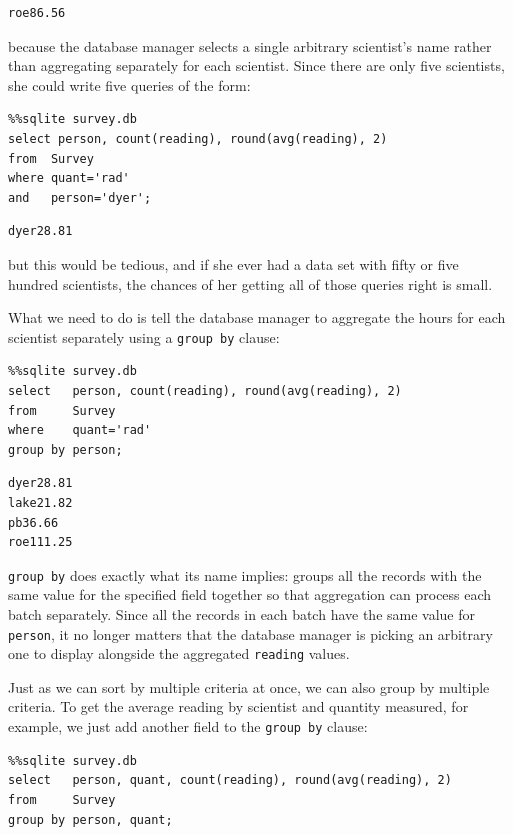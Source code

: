\documentclass{book}
\begin{document}
\begin{verbatim}
roe86.56
\end{verbatim}

because the database manager selects a single arbitrary scientist's name
rather than aggregating separately for each scientist. Since there are
only five scientists, she could write five queries of the form:

\begin{verbatim}
%%sqlite survey.db
select person, count(reading), round(avg(reading), 2)
from  Survey
where quant='rad'
and   person='dyer';
\end{verbatim}

\begin{verbatim}
dyer28.81
\end{verbatim}

but this would be tedious, and if she ever had a data set with fifty or
five hundred scientists, the chances of her getting all of those queries
right is small.

What we need to do is tell the database manager to aggregate the hours
for each scientist separately using a \texttt{group by} clause:

\begin{verbatim}
%%sqlite survey.db
select   person, count(reading), round(avg(reading), 2)
from     Survey
where    quant='rad'
group by person;
\end{verbatim}

\begin{verbatim}
dyer28.81
lake21.82
pb36.66
roe111.25
\end{verbatim}

\texttt{group by} does exactly what its name implies: groups all the
records with the same value for the specified field together so that
aggregation can process each batch separately. Since all the records in
each batch have the same value for \texttt{person}, it no longer matters
that the database manager is picking an arbitrary one to display
alongside the aggregated \texttt{reading} values.

Just as we can sort by multiple criteria at once, we can also group by
multiple criteria. To get the average reading by scientist and quantity
measured, for example, we just add another field to the
\texttt{group by} clause:

\begin{verbatim}
%%sqlite survey.db
select   person, quant, count(reading), round(avg(reading), 2)
from     Survey
group by person, quant;
\end{verbatim}
\end{document}
